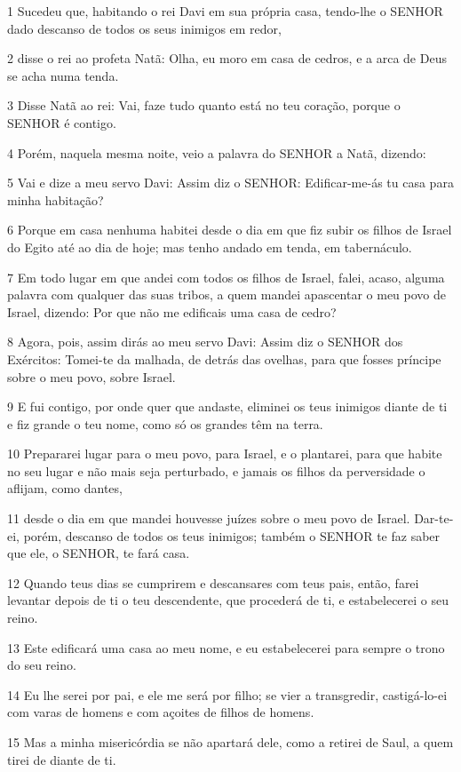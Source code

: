 \par 1 Sucedeu que, habitando o rei Davi em sua própria casa, tendo-lhe o SENHOR dado descanso de todos os seus inimigos em redor,
\par 2 disse o rei ao profeta Natã: Olha, eu moro em casa de cedros, e a arca de Deus se acha numa tenda.
\par 3 Disse Natã ao rei: Vai, faze tudo quanto está no teu coração, porque o SENHOR é contigo.
\par 4 Porém, naquela mesma noite, veio a palavra do SENHOR a Natã, dizendo:
\par 5 Vai e dize a meu servo Davi: Assim diz o SENHOR: Edificar-me-ás tu casa para minha habitação?
\par 6 Porque em casa nenhuma habitei desde o dia em que fiz subir os filhos de Israel do Egito até ao dia de hoje; mas tenho andado em tenda, em tabernáculo.
\par 7 Em todo lugar em que andei com todos os filhos de Israel, falei, acaso, alguma palavra com qualquer das suas tribos, a quem mandei apascentar o meu povo de Israel, dizendo: Por que não me edificais uma casa de cedro?
\par 8 Agora, pois, assim dirás ao meu servo Davi: Assim diz o SENHOR dos Exércitos: Tomei-te da malhada, de detrás das ovelhas, para que fosses príncipe sobre o meu povo, sobre Israel.
\par 9 E fui contigo, por onde quer que andaste, eliminei os teus inimigos diante de ti e fiz grande o teu nome, como só os grandes têm na terra.
\par 10 Prepararei lugar para o meu povo, para Israel, e o plantarei, para que habite no seu lugar e não mais seja perturbado, e jamais os filhos da perversidade o aflijam, como dantes,
\par 11 desde o dia em que mandei houvesse juízes sobre o meu povo de Israel. Dar-te-ei, porém, descanso de todos os teus inimigos; também o SENHOR te faz saber que ele, o SENHOR, te fará casa.
\par 12 Quando teus dias se cumprirem e descansares com teus pais, então, farei levantar depois de ti o teu descendente, que procederá de ti, e estabelecerei o seu reino.
\par 13 Este edificará uma casa ao meu nome, e eu estabelecerei para sempre o trono do seu reino.
\par 14 Eu lhe serei por pai, e ele me será por filho; se vier a transgredir, castigá-lo-ei com varas de homens e com açoites de filhos de homens.
\par 15 Mas a minha misericórdia se não apartará dele, como a retirei de Saul, a quem tirei de diante de ti.
